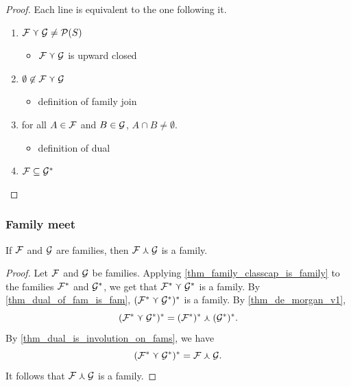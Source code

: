 \begin{proof}
     Each line is equivalent to the one following it.
    \begin{enumerate}
        \item $\mathcal{F} \curlyvee \mathcal{G} \neq \mathcal{P}(S)$
        \begin{itemize}
            \item[--] $\mathcal{F} \curlyvee \mathcal{G}$ is upward closed
        \end{itemize}
        \item $\emptyset \not\in \mathcal{F} \curlyvee \mathcal{G}$
        \begin{itemize}
            \item[--] definition of family join
        \end{itemize}
        \item for all $A \in \mathcal{F}$ and $B \in \mathcal{G}$, $A \cap B \neq \emptyset$.
        \begin{itemize}
            \item[--] definition of dual
        \end{itemize}
        \item $\mathcal{F} \subseteq \mathcal{G}^*$
    \end{enumerate}
\end{proof}

\subsubsection{Family meet}

\begin{theorem}
\label{thm_family_classcapdual_is_family}
    If $\mathcal{F}$ and $\mathcal{G}$ are families, then $\mathcal{F} \curlywedge \mathcal{G}$ is a family.
\end{theorem}

\begin{proof}
    Let $\mathcal{F}$ and $\mathcal{G}$ be families.  Applying \cref{thm_family_classcap_is_family} to the families $\mathcal{F}^*$ and $\mathcal{G}^*$, we get that $\mathcal{F}^* \curlyvee \mathcal{G}^*$ is a family.  By \cref{thm_dual_of_fam_is_fam}, $(\mathcal{F}^* \curlyvee \mathcal{G}^*)^*$ is a family.  By \cref{thm_de_morgan_v1},
    \[(\mathcal{F}^* \curlyvee \mathcal{G}^*)^* = (\mathcal{F}^*)^* \curlywedge (\mathcal{G}^*)^*.\]
    By \cref{thm_dual_is_involution_on_fams}, we have
    \[(\mathcal{F}^* \curlyvee \mathcal{G}^*)^* = \mathcal{F} \curlywedge \mathcal{G}.\]
    It follows that $\mathcal{F} \curlywedge \mathcal{G}$ is a family.
\end{proof}

